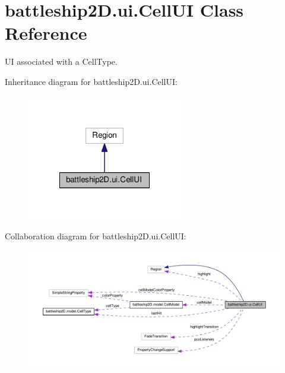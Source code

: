 \hypertarget{classbattleship2D_1_1ui_1_1CellUI}{\section{battleship2\-D.\-ui.\-Cell\-U\-I Class Reference}
\label{classbattleship2D_1_1ui_1_1CellUI}
}


U\-I associated with a Cell\-Type.  




Inheritance diagram for battleship2\-D.\-ui.\-Cell\-U\-I\-:\nopagebreak
\begin{figure}[H]
\begin{center}
\leavevmode
\includegraphics[width=192pt]{classbattleship2D_1_1ui_1_1CellUI__inherit__graph}
\end{center}
\end{figure}


Collaboration diagram for battleship2\-D.\-ui.\-Cell\-U\-I\-:\nopagebreak
\begin{figure}[H]
\begin{center}
\leavevmode
\includegraphics[width=350pt]{classbattleship2D_1_1ui_1_1CellUI__coll__graph}
\end{center}
\end{figure}

